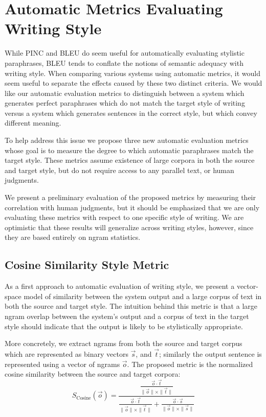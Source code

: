 \documentclass[10pt,a5paper,twoside]{article}
\begin{document}
\section{Automatic Metrics Evaluating Writing Style}
While PINC and BLEU do seem useful for automatically evaluating stylistic paraphrases, BLEU tends to conflate the notions of
semantic adequacy with writing style.  When comparing various systems using automatic metrics, it would seem useful
to separate the effects caused by these two distinct criteria.  We would like our automatic evaluation metrics to distinguish
between a system which generates perfect paraphrases which do not match the target style of writing versus a system which
generates sentences in the correct style, but which convey different meaning.

To help address this issue we propose three new automatic evaluation metrics whose goal is to measure the degree to which
automatic paraphrases match the target style.  These metrics assume existence of large corpora in both the source and
target style, but do not require access to any parallel text, or human judgments.

We present a preliminary evaluation of the proposed metrics by measuring their correlation with human judgments, but
it should be emphasized that we are only evaluating these metrics with respect to one specific style of writing.  We
are optimistic that these results will generalize across writing styles, however, since they are based entirely
on ngram statistics.

\subsection{Cosine Similarity Style Metric}
As a first approach to automatic evaluation of writing style, we present a vector-space model of similarity between the system
output and a large corpus of text in both the source and target style.  The intuition behind this metric is that  a large ngram
overlap between the system's output and a corpus of text in the target style should indicate that the
output is likely to be stylistically appropriate.

More concretely, we extract ngrams from both the source and target corpus which are represented as binary
vectors $\vec{s}$, and $\vec{t}$; similarly the output sentence is represented using a vector of
ngrams $\vec{o}$.  
The proposed metric is the normalized cosine similarity between the source and target corpora:
\[
S_{\text{Cosine}}(\vec{o}) = \frac{\frac{\vec{o} \cdot \vec{t}}{\|\vec{o}\| \times \|\vec{t}\|}}{\frac{\vec{o} \cdot \vec{t}}{\|\vec{o}\| \times \|\vec{t}\|} + \frac{\vec{o} \cdot \vec{s}}{\|\vec{o}\| \times \|\vec{s}\|}}
\]
\end{document}
